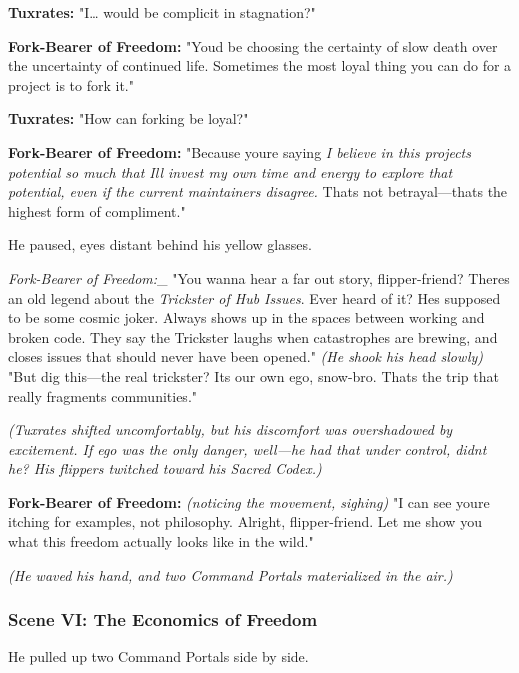 \textbf{Tuxrates:} "I\ldots{} would be complicit in stagnation?"

\textbf{Fork-Bearer of Freedom:} "You\textquotesingle d be choosing the certainty of slow death over the uncertainty of continued life. Sometimes the most loyal thing you can do for a project is to fork it."

\textbf{Tuxrates:} "How can forking be loyal?"

\textbf{Fork-Bearer of Freedom:} "Because you\textquotesingle re saying \emph{\textquotesingle I believe in this project\textquotesingle s potential so much that I\textquotesingle ll invest my own time and energy to explore that potential, even if the current maintainers disagree.\textquotesingle{}} That\textquotesingle s not betrayal---that\textquotesingle s the highest form of compliment."

He paused, eyes distant behind his yellow glasses.

\emph{Fork-Bearer of Freedom:}\_ "You wanna hear a far out story, flipper-friend? There\textquotesingle s an old legend about the \emph{Trickster of Hub Issues}. Ever heard of it? He\textquotesingle s supposed to be some cosmic joker. Always shows up in the spaces between working and broken code. They say the Trickster laughs when catastrophes are brewing, and closes issues that should never have been opened." \emph{(He shook his head slowly)} "But dig this---the real trickster? It\textquotesingle s our own ego, snow-bro. That\textquotesingle s the trip that really fragments communities."

\emph{(Tuxrates shifted uncomfortably, but his discomfort was overshadowed by excitement. If ego was the only danger, well---he had that under control, didn\textquotesingle t he? His flippers twitched toward his Sacred Codex.)}

\textbf{Fork-Bearer of Freedom:} \emph{(noticing the movement, sighing)} "I can see you\textquotesingle re itching for examples, not philosophy. Alright, flipper-friend. Let me show you what this freedom actually looks like in the wild."

\emph{(He waved his hand, and two Command Portals materialized in the air.)}

\subsubsection{Scene VI: The Economics of Freedom}\label{scene-vi-the-economics-of-freedom}

He pulled up two Command Portals side by side.

